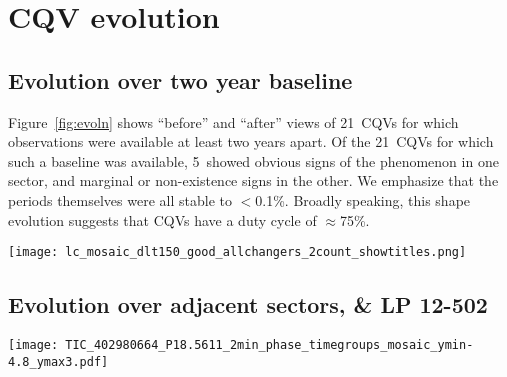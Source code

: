 \documentclass[11pt,twocolumn,tighten]{aastex63}
\newcommand{\ntwoyear}{21} %
\newcommand{\ntwoyearturnedoff}{5} %
\begin{document}
\section{CQV evolution}

\subsection{Evolution over two year baseline}

Figure~\ref{fig:evoln} shows ``before'' and ``after'' views
of \ntwoyear\ CQVs for which observations were available at least two years
apart.
Of the \ntwoyear\ CQVs for which such a baseline was available,
\ntwoyearturnedoff\ showed obvious signs of the phenomenon in one sector,
and marginal or non-existence signs in the other.
We emphasize that the periods themselves were all stable to $<$0.1\%.
Broadly speaking, this shape evolution
suggests that CQVs have a duty cycle of $\approx$75\%.


\begin{figure*}[!t]
	\begin{center}
		\centering
		\texttt{[image: lc\_mosaic\_dlt150\_good\_allchangers\_2count\_showtitles.png]}
		\vspace{-0.2cm}
		\caption{
			{\bf Evolution of CQVs}: ``Before and
			after'...  Panels
			in the top two rows are separated by two years
			($\approx$$10^3$ cycles); each panel shows one month.
			Periods are listed in hours. 
			{\bf todo: fix the plot and the caption.}
		}
		\label{fig:evoln}
	\end{center}
\end{figure*}




\subsection{Evolution over adjacent sectors, \& LP 12-502}
\begin{figure*}[!t]
	\begin{center}
		\centering
		\texttt{[image: TIC\_402980664\_P18.5611\_2min\_phase\_timegroups\_mosaic\_ymin-4.8\_ymax3.pdf]}
		\vspace{-0.45cm}
		\caption{
			Evolution of LP 12-502 ($P$=18.6\,h) at fixed period and
			epoch over three years. 
			Each panel shows one (stacked) TESS orbit; small text denotes relative cycle number.
			There are 200 binned black points per cycle.
			The TESS pointing law dictates time gaps; larger gaps tend to
			yield larger shape changes.
			The dips usually evolve over tens to hundreds of cycles.
			However cycles 1233-1264 show a dip that ``switched'' from a depth
			and duration of 3\% and 3\,hr to 0.3\% and 1\,hr over less than
			one cycle.
		}
		\label{fig:lp}
	\end{center}


\end{figure*}
\end{document}
